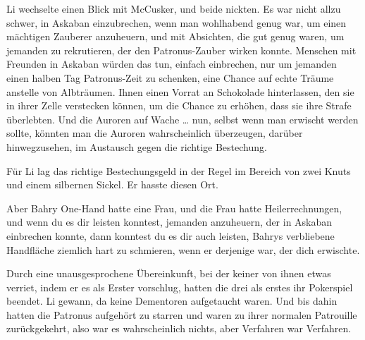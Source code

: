 Li wechselte einen Blick mit McCusker, und beide nickten. Es war nicht allzu schwer, in Askaban einzubrechen, wenn man wohlhabend genug war, um einen mächtigen Zauberer anzuheuern, und mit Absichten, die gut genug waren, um jemanden zu rekrutieren, der den Patronus-Zauber wirken konnte. Menschen mit Freunden in Askaban würden das tun, einfach einbrechen, nur um jemanden einen halben Tag Patronus-Zeit zu schenken, eine Chance auf echte Träume anstelle von Albträumen. Ihnen einen Vorrat an Schokolade hinterlassen, den sie in ihrer Zelle verstecken können, um die Chance zu erhöhen, dass sie ihre Strafe überlebten. Und die Auroren auf Wache … nun, selbst wenn man erwischt werden sollte, könnten man die Auroren wahrscheinlich überzeugen, darüber hinwegzusehen, im Austausch gegen die richtige Bestechung.

Für Li lag das richtige Bestechungsgeld in der Regel im Bereich von zwei Knuts und einem silbernen Sickel. Er hasste diesen Ort.

Aber Bahry One-Hand hatte eine Frau, und die Frau hatte Heilerrechnungen, und wenn du es dir leisten konntest, jemanden anzuheuern, der in Askaban einbrechen konnte, dann konntest du es dir auch leisten, Bahrys verbliebene Handfläche ziemlich hart zu schmieren, wenn er derjenige war, der dich erwischte.

Durch eine unausgesprochene Übereinkunft, bei der keiner von ihnen etwas verriet, indem er es als Erster vorschlug, hatten die drei als erstes ihr Pokerspiel beendet. Li gewann, da keine Dementoren aufgetaucht waren. Und bis dahin hatten die Patronus aufgehört zu starren und waren zu ihrer normalen Patrouille zurückgekehrt, also war es wahrscheinlich nichts, aber Verfahren war Verfahren.

